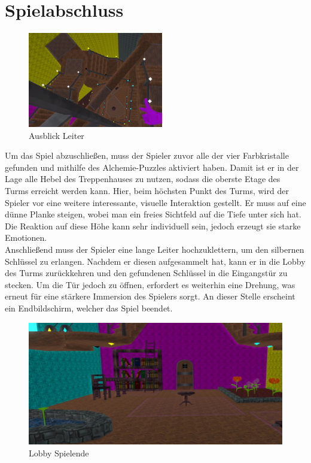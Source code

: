 \section{Spielabschluss}
\begin{figure}
	\vspace*{-0.5cm}
	\includegraphics[width=5.9cm]{Pictures/Ausblick_Leiter}
	\caption{Ausblick Leiter}
	\vspace*{-0.5cm}
	\label{fig:leiter}
\end{figure}
Um das Spiel abzuschließen, muss der Spieler zuvor alle der vier Farbkristalle gefunden und mithilfe des Alchemie-Puzzles aktiviert haben. Damit ist er in der Lage alle Hebel des Treppenhauses zu nutzen, sodass die oberste Etage des Turms erreicht werden kann. Hier, beim höchsten Punkt des Turms, wird der Spieler vor eine weitere interessante, visuelle Interaktion gestellt. Er muss auf eine dünne Planke steigen, wobei man ein freies Sichtfeld auf die Tiefe unter sich hat. Die Reaktion auf diese Höhe kann sehr individuell sein, jedoch erzeugt sie starke Emotionen.\\
Anschließend muss der Spieler eine lange Leiter hochzuklettern, um den silbernen Schlüssel zu erlangen. Nachdem er diesen aufgesammelt hat, kann er in die Lobby des Turms zurückkehren und den gefundenen Schlüssel in die Eingangstür zu stecken. Um die Tür jedoch zu öffnen, erfordert es weiterhin eine Drehung, was erneut für eine stärkere Immersion des Spielers sorgt. An dieser Stelle erscheint ein Endbildschirm, welcher das Spiel beendet.
\begin{figure}[h]
	\centering
	\includegraphics[width=\textwidth/2]{Pictures/Lobby_Final}
	\caption{Lobby Spielende}
	\label{fig:lobby_final}
\end{figure}